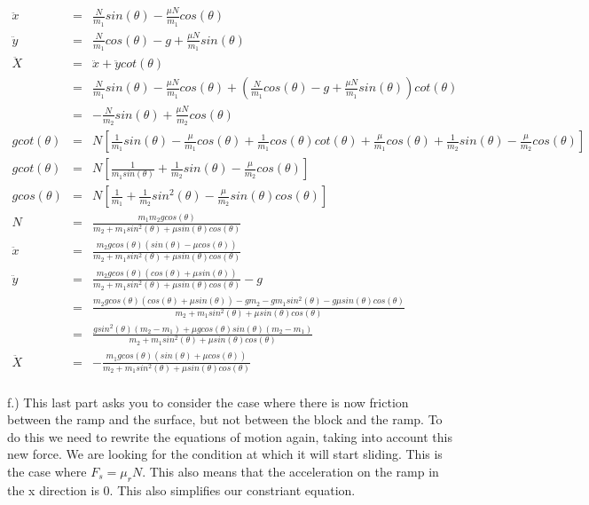 \documentclass[11pt]{amsart}
\begin{document}
\begin{eqnarray*}
\ddot{x}  &=& \frac{N}{m_{1}}sin(\theta)-\frac{\mu{N}}{m_{1}}cos(\theta) \\
\ddot{y} &=&  \frac{N}{m_{1}}cos(\theta)-g +\frac{\mu{N}}{m_{1}}sin(\theta) \\
\ddot{X} &=& \ddot{x}+\ddot{y}cot(\theta) \\
&=& \frac{N}{m_{1}}sin(\theta)-\frac{\mu{N}}{m_{1}}cos(\theta)+(\frac{N}{m_{1}}cos(\theta)-g +\frac{\mu{N}}{m_{1}}sin(\theta))cot(\theta) \\
&=&  -\frac{N}{m_{2}}sin(\theta)+\frac{\mu{N}}{m_{2}}cos(\theta) \\
gcot(\theta) &=& N[\frac{1}{m_{1}}sin(\theta)-\frac{\mu}{m_{1}}cos(\theta)+\frac{1}{m_{1}}cos(\theta)cot(\theta)+\frac{\mu}{m_{1}}cos(\theta)+\frac{1}{m_{2}}sin(\theta)-\frac{\mu}{m_{2}}cos(\theta)]  \\
gcot(\theta) &=& N[\frac{1}{m_{1}sin(\theta)}+\frac{1}{m_{2}}sin(\theta)-\frac{\mu}{m_{2}}cos(\theta)] \\
gcos(\theta) &=& N[\frac{1}{m_{1}}+\frac{1}{m_{2}}sin^{2}(\theta)-\frac{\mu}{m_{2}}sin(\theta)cos(\theta)] \\
N &=& \frac{m_{1}m_{2}gcos(\theta)}{m_{2}+m_{1}sin^{2}(\theta)+\mu{sin(\theta)cos(\theta)}} \\
\ddot{x} &=& \frac{m_{2}gcos(\theta)(sin(\theta)-\mu{cos(\theta)})}{m_{2}+m_{1}sin^{2}(\theta)+\mu{sin(\theta)cos(\theta)}} \\
\ddot{y} &=& \frac{m_{2}gcos(\theta)(cos(\theta)+\mu{sin(\theta)})}{m_{2}+m_{1}sin^{2}(\theta)+\mu{sin(\theta)cos(\theta)}} -g \\
&=&\frac{m_{2}gcos(\theta)(cos(\theta)+\mu{sin(\theta)})-gm_{2}-gm_{1}sin^{2}(\theta)-g\mu{sin(\theta)cos(\theta)}}{m_{2}+m_{1}sin^{2}(\theta)+\mu{sin(\theta)cos(\theta)}} \\
&=& \frac{gsin^{2}(\theta)(m_{2}-m_{1})+\mu{g}cos(\theta)sin(\theta)(m_{2}-m_{1})}{m_{2}+m_{1}sin^{2}(\theta)+\mu{sin(\theta)cos(\theta)}} \\
\ddot{X} &=&- \frac{m_{1}gcos(\theta)(sin(\theta)+\mu{cos(\theta)})}{m_{2}+m_{1}sin^{2}(\theta)+\mu{sin(\theta)cos(\theta)} }
\end{eqnarray*} \\
f.) This last part asks you to consider the case where there is now friction between the ramp and the surface, but not between the block and the ramp. To do this we need to rewrite the equations of motion again, taking into account this new force. We are looking for the condition at which it will start sliding. This is the case where $F_{s}=\mu_{r}N$. This also means that the acceleration on the ramp in the x direction is 0. This also simplifies our constriant equation. \\
\end{document}
